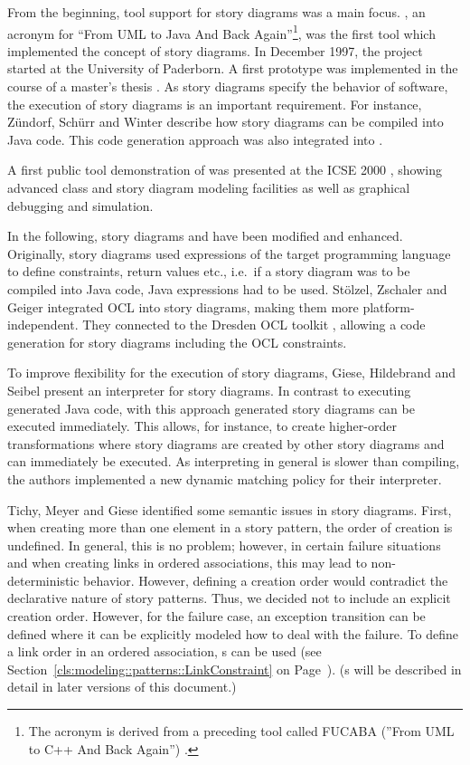 From the beginning, tool support for story diagrams was a main focus.
\fuj, an acronym for ``From UML to Java And Back Again''\footnote{The acronym is derived from a preceding tool called FUCABA (''From UML to C++ And Back Again'') \cite{JZ97}.}, was the first tool which implemented the concept of story diagrams.
In December 1997, the project started at the University of Paderborn.
A first prototype was implemented in the course of a master's thesis \cite{FNT98}.
As story diagrams specify the behavior of software, the execution of story diagrams is an important requirement.
For instance, Z\"{u}ndorf, Sch\"{u}rr and Winter \cite{ZSW99} describe how story diagrams can be compiled into Java code.
This code generation approach was also integrated into \fuj.

A first public tool demonstration of \fuj was presented at the ICSE 2000 \cite{NNZ00}, showing advanced class and story diagram modeling facilities as well as graphical debugging and simulation.

In the following, story diagrams and \fuj have been modified and enhanced.
Originally, story diagrams used expressions of the target programming language to define constraints, return values etc.,
i.e.\ if a story diagram was to be compiled into Java code, Java expressions had to be used.
St\"{o}lzel, Zschaler and Geiger \cite{SZG07} integrated OCL into story diagrams, making them more platform-independent.
They connected \fuj to the Dresden OCL toolkit \cite{DresdenOCL}, allowing a code generation for story diagrams including the OCL constraints.

To improve flexibility for the execution of story diagrams, Giese, Hildebrand and Seibel \cite{GHS09} present an interpreter for story diagrams.
In contrast to executing generated Java code, with this approach generated story diagrams can be executed immediately.
This allows, for instance, to create higher-order transformations where story diagrams are created by other story diagrams and can immediately be executed.
As interpreting in general is slower than compiling, the authors implemented a new dynamic matching policy for their interpreter.

Tichy, Meyer and Giese \cite{TMG06} identified some semantic issues in story diagrams.
First, when creating more than one element in a story pattern, the order of creation is undefined.
In general, this is no problem; however, in certain failure situations and when creating links in ordered associations, this may lead to non-deterministic behavior.
However, defining a creation order would contradict the declarative nature of story patterns.
Thus, we decided not to include an explicit creation order.
However, for the failure case, an exception transition can be defined where it can be explicitly modeled how to deal with the failure.
To define a link order in an ordered association, s can be used (see Section~\ref{cls:modeling::patterns::LinkConstraint} on Page~\pageref{cls:modeling::patterns::LinkConstraint}).
(s will be described in detail in later versions of this document.)

